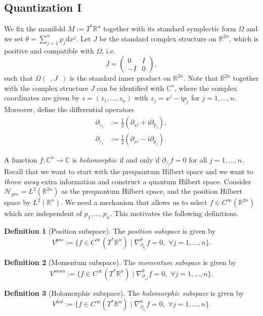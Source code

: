 \documentclass[11pt]{amsart}
\numberwithin{equation}{section}
\theoremstyle{plain}
\theoremstyle{definition}
\newtheorem{defn}{Definition}[subsection]
\theoremstyle{remark}
\newcommand{\R}{\mathbb{R}}
\newcommand{\dd}{{\mathrm{d}}}
\newcommand{\de}{\partial}
\newcommand{\calH}{\mathcal{H}}
\newcommand{\I}{\mathrm{i}}
\begin{document}
\subsection{Quantization I}
We fix the manifold $M:=T^*\R^n$ together with its standard symplectic form $\Omega$ and we set $\theta=\sum_{j=1}^np_j\dd x^j$. Let $J$ be the standard complex structure on $\R^{2n}$, which is positive and compatible with $\Omega$, i.e. 
$$J=\begin{pmatrix}0&I\\ -I&0\end{pmatrix},$$
such that $\Omega(\enspace,J\enspace)$ is the standard inner product on $\R^{2n}$. Note that $\R^{2n}$ together with the complex structure $J$ can be identified with $\mathbb{C}^n$, where the complex coordinates are given by $z=(z_1,...,z_n)$ with $z_j=x^j-\I p_j$ for $j=1,...,n$. Moreover, define the differential operators
\begin{align*}
\partial_{z_j}&:=\frac{1}{2}\left(\partial_{x^j}+\I\partial_{p_j}\right),\\
\partial_{\bar z_j}&:=\frac{1}{2}\left(\partial_{x^j}-\I\partial_{p_j}\right).
\end{align*}

A function $f\colon\mathbb{C}^n\to \mathbb{C}$ is \emph{holomorphic} if and only if $\partial_{\bar z_j}f=0$ for all $j=1,...,n$. Recall that we want to start with the prequantum Hilbert space and we want to \emph{throw away} extra information and construct a quantum Hilbert space. Consider $\calH_{pre}=L^2(\R^{2n})$ as the prequantum Hilbert space, and the position Hilbert space by $L^2(\R^n)$. We need a mechanism that allows us to select $f\in C^\infty(\R^{2n})$ which are independent of $p_1,...,p_n$. This motivates the following definitions. 

\begin{defn}[Position subspace]
The \emph{position subspace} is given by 
\[
V^{pos}:=\{f\in C^\infty(T^*\R^n)\mid \nabla_{\de_{p_j}}^\theta f=0,\,\, \forall j=1,...,n\}.
\]
\end{defn}

\begin{defn}[Momentum subspace]
The \emph{momentum subspace} is given by 
\[
V^{mom}:=\{f\in C^\infty(T^*\R^n)\mid \nabla_{\de_{x^j}}^\theta f=0,\,\, \forall j=1,...,n\}.
\]
\end{defn}

\begin{defn}[Holomorphic subspace]
The \emph{holomorphic subspace} is given by 
\[
V^{hol}:=\{f\in C^\infty(T^*\R^n)\mid \nabla_{\de_{\bar z_j}}^\theta f=0,\,\, \forall j=1,...,n\}.
\]
\end{defn}
\end{document}
